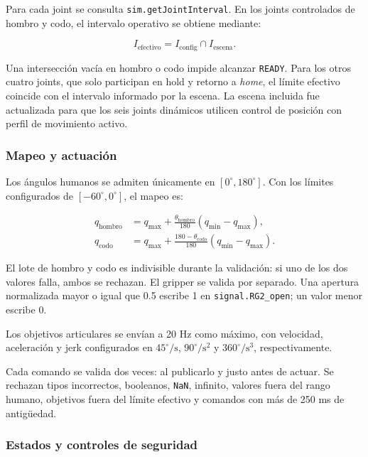 Para cada joint se consulta \texttt{sim.getJointInterval}. En los joints
controlados de hombro y codo, el intervalo operativo se obtiene mediante:

\begin{equation}
    I_{\mathrm{efectivo}} =
    I_{\mathrm{config}}\cap I_{\mathrm{escena}}.
    \label{eq:limite_efectivo}
\end{equation}

Una intersección vacía en hombro o codo impide alcanzar \texttt{READY}. Para
los otros cuatro joints, que solo participan en hold y retorno a
\textit{home}, el límite efectivo coincide con el intervalo informado por la
escena. La escena incluida fue actualizada para que los seis joints dinámicos
utilicen control de posición con perfil de movimiento activo.

\subsubsection*{Mapeo y actuación}

Los ángulos humanos se admiten únicamente en $[0^\circ,180^\circ]$. Con los
límites configurados de $[-60^\circ,0^\circ]$, el mapeo es:

\begin{align}
    q_{\mathrm{hombro}} &=
    q_{\mathrm{max}} + \frac{\theta_{\mathrm{hombro}}}{180}
    (q_{\mathrm{min}}-q_{\mathrm{max}}), \\
    q_{\mathrm{codo}} &=
    q_{\mathrm{max}} + \frac{180-\theta_{\mathrm{codo}}}{180}
    (q_{\mathrm{min}}-q_{\mathrm{max}}).
    \label{eq:mapeo_ur5}
\end{align}

El lote de hombro y codo es indivisible durante la validación: si uno de los
dos valores falla, ambos se rechazan. El gripper se valida por separado. Una
apertura normalizada mayor o igual que 0.5 escribe 1 en
\texttt{signal.RG2\_open}; un valor menor escribe 0.

Los objetivos articulares se envían a 20 Hz como máximo, con velocidad,
aceleración y jerk configurados en $45^\circ/\mathrm{s}$,
$90^\circ/\mathrm{s}^{2}$ y $360^\circ/\mathrm{s}^{3}$, respectivamente.

Cada comando se valida dos veces: al publicarlo y justo antes de actuar. Se
rechazan tipos incorrectos, booleanos, \texttt{NaN}, infinito, valores fuera
del rango humano, objetivos fuera del límite efectivo y comandos con más de
250 ms de antigüedad.

\subsubsection*{Estados y controles de seguridad}

